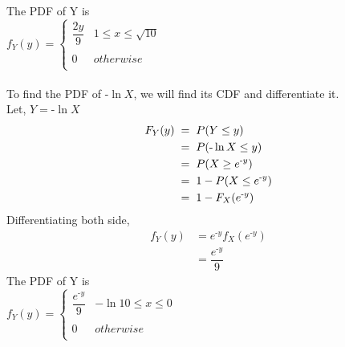 \documentclass{article}
\begin{document}
\begin{enumerate}
The PDF of Y is\\
$f_Y(y) =  {  \left\{
\begin{array}{ll}
      {\dfrac{2y}{9}}&  1\leq x\leq \sqrt{10} \\\\
      0 & otherwise \\
\end{array}\right. }$\\\\
To find the PDF of $ \text{-} \ln{X}$, we will find its CDF and differentiate it.\\
Let, $Y = \text{-}\ln{X}$
\begin{align*}
    F_Y(y)\hspace{1mm} =& \hspace{2mm}P(Y \leq y)\\
    =& \hspace{2mm}P(\text{-}\ln{X} \leq y)\\
    =& \hspace{2mm}P(X \geq e^{\text{-}y})\\
    =& \hspace{2mm}1 - P(X \leq e^{\text{-}y})\\
    =& \hspace{2mm}1 - F_X(e^{\text{-}y})
\end{align*}
Differentiating both side,
\begin{align*}
f_Y(y) &= e^{\text{-}y}f_X(e^{\text{-}y})\\
 &= \dfrac{e^{\text{-}y}}{9}
\end{align*}
The PDF of Y is\\
$f_Y(y) =  {  \left\{
\begin{array}{ll}
      {\dfrac{e^{\text{-}y}}{9}}&  -\ln{10}\leq x\leq 0 \\\\
      0 & otherwise \\
\end{array}\right. }$

\end{enumerate}
\end{document}
